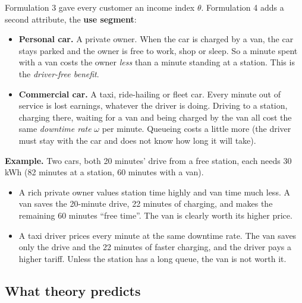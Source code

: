 Formulation 3 gave every customer an income index $\theta$. Formulation 4 adds a second attribute, the \textbf{use segment}:
\begin{itemize}
  \item \textbf{Personal car.} A private owner. When the car is charged by a van, the car stays parked and the owner is free to work, shop or sleep. So a minute spent with a van costs the owner \emph{less} than a minute standing at a station. This is the \emph{driver-free benefit}.
  \item \textbf{Commercial car.} A taxi, ride-hailing or fleet car. Every minute out of service is lost earnings, whatever the driver is doing. Driving to a station, charging there, waiting for a van and being charged by the van all cost the same \emph{downtime rate} $\omega$ per minute. Queueing costs a little more (the driver must stay with the car and does not know how long it will take).
\end{itemize}

\begin{example}
\textbf{Example.} Two cars, both 20 minutes' drive from a free station, each needs 30 kWh (82 minutes at a station, 60 minutes with a van).
\begin{itemize}
  \item A rich private owner values station time highly and van time much less. A van saves the 20-minute drive, 22 minutes of charging, and makes the remaining 60 minutes ``free time''. The van is clearly worth its higher price.
  \item A taxi driver prices every minute at the same downtime rate. The van saves only the drive and the 22 minutes of faster charging, and the driver pays a higher tariff. Unless the station has a long queue, the van is not worth it.
\end{itemize}
\end{example}

\subsection{What theory predicts}

